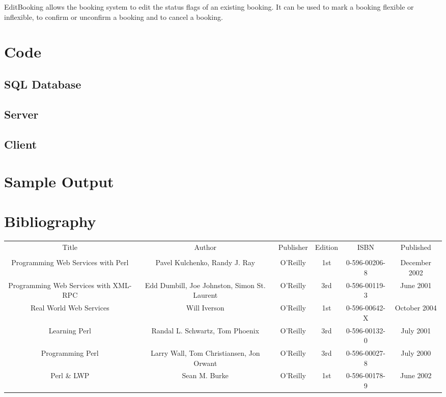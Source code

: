 \documentclass[a4paper,12pt]{article}
\begin{document}
EditBooking allows the booking system to edit the status flags of an
existing booking. It can be used to mark a booking flexible or
inflexible, to confirm or unconfirm a booking and to cancel a booking.

\section{Code}

\subsection{SQL Database}


%

\subsection{Server}

\subsection{Client}

\section{Sample Output}

\section{Bibliography}

\begin{tabular}{cccccc}
Title	&	Author	&	Publisher	&	Edition	&	 ISBN	&	Published	\\
		&				&					&				&			\\
Programming Web Services with Perl	&	Pavel Kulchenko,  Randy J. Ray & O'Reilly	&	1st	&	0-596-00206-8 &	December 2002	\\
Programming Web Services with XML-RPC	&	Edd Dumbill, Joe Johnston, Simon St. Laurent &	O'Reilly	& 3rd	&	0-596-00119-3	&	June 2001	\\
Real World Web Services	&	Will Iverson	&	O'Reilly	&	1st	& 0-596-00642-X	&	October 2004	\\
Learning Perl	&	Randal L. Schwartz, Tom Phoenix	&	O'Reilly	&	3rd &	0-596-00132-0	&	July 2001	\\
Programming Perl	&	Larry Wall, Tom Christiansen, Jon Orwant	& O'Reilly	&	3rd	&	0-596-00027-8	&	July 2000	\\
Perl \& LWP	&	Sean M. Burke	&	O'Reilly	&	1st	&	0-596-00178-9	& June 2002	\\

\end{tabular}
\end{document}
